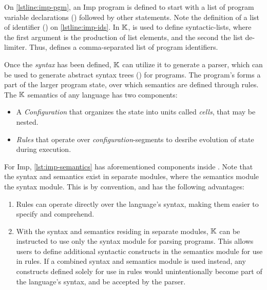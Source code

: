 On \autoref{lstline:imp-pgm}, an Imp program is defined to start with a list of program variable
declarations () followed by other statements. Note the
definition of a list of identifier () on \autoref{lstline:imp-ids}. In $\mathbb{K}{}$,
 is used to define syntactic-lists, where the first
argument is the production of list elements, and the second the list de-limiter.
Thus,  defines a comma-separated list of program identifiers.

Once the \emph{syntax} has been defined, $\mathbb{K}$ can utilize it to generate a
parser, which can be used to generate abstract
syntax trees (\ASTs{}) for programs. The program's \AST{} forms a part of the larger
program state, over which semantics are defined through rules.
The $\mathbb{K}$ semantics of any language has two components:
\begin{itemize}
  \item A \emph{Configuration} that organizes the state
    into units called \emph{cells}, that may be nested.
  \item \emph{Rules} that operate over \emph{configuration}-segments
    to desribe evolution of state during execution.
\end{itemize}
For Imp, \autoref{lst:imp-semantics} has aforementioned
components inside .
Note that the syntax and semantics exist in separate modules,
where the semantics module 
the syntax module. This is by convention, and
has the following advantages:
\begin{enumerate}[label=\alph*)]
  \item Rules can operate directly over the language's syntax,
    making them easier to specify and comprehend.
  \item With the syntax and semantics residing in separate modules,
    $\mathbb{K}$ can be instructed to use only the syntax module for parsing programs.
    This allows users to define additional syntactic constructs in the semantics module
    for use in rules. If a combined syntax and semantics module is used instead,
    any constructs defined solely for use in rules
    would unintentionally become part of the language's syntax,
    and be accepted by the parser.
\end{enumerate}


